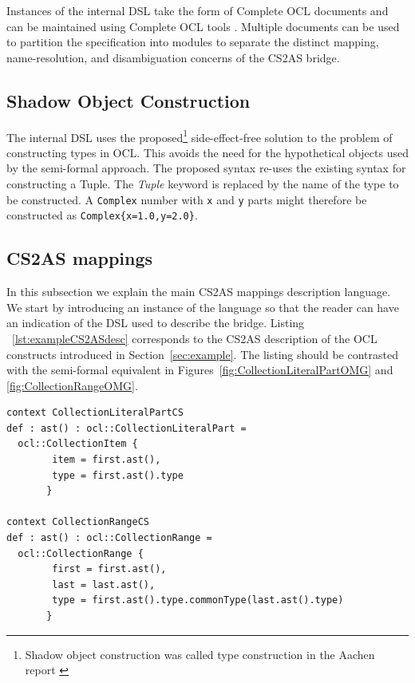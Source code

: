 \documentclass{llncs}
\begin{document}
Instances of the internal DSL take the form of Complete OCL documents and can be maintained using Complete OCL tools \cite{eclipseOclOnline}. Multiple documents can be used to partition the specification into modules %
to separate the distinct mapping, name-resolution, and disambiguation concerns of the CS2AS bridge.

\subsection{Shadow Object Construction}
\label{subsec:ShadowExp}

The internal DSL uses the proposed\footnote{Shadow object construction was called type construction in the Aachen report \cite{brucker2013aachenReport}} side-effect-free solution to the problem of constructing types in OCL. This avoids the need for the hypothetical objects used by the semi-formal approach. The proposed syntax re-uses the existing syntax for constructing a Tuple. The \emph{Tuple} keyword is replaced by the name of the type to be constructed. A \verb$Complex$ number with \verb$x$ and \verb$y$ parts might therefore be constructed as \verb$Complex{x=1.0,y=2.0}$. %

\subsection{CS2AS mappings}
\label{subsec:mappings}

In this subsection we explain the main CS2AS mappings description language. We start by introducing an instance of the language so that the reader can have an indication of the DSL used to describe the bridge. Listing ~\ref{lst:exampleCS2ASdesc} corresponds to the CS2AS description of the OCL constructs introduced in Section~\ref{sec:example}. The listing should be contrasted with the semi-formal equivalent in Figures~\ref{fig:CollectionLiteralPartOMG} and \ref{fig:CollectionRangeOMG}.

\begin{lstlisting}[caption=CS2AS bridge for CollectionLiteralPart and CollectionRange, label=lst:exampleCS2ASdesc, language=OCL]
context CollectionLiteralPartCS	
def : ast() : ocl::CollectionLiteralPart = 
  ocl::CollectionItem {
        item = first.ast(),	
        type = first.ast().type
       }
  
context CollectionRangeCS	
def : ast() : ocl::CollectionRange = 
  ocl::CollectionRange {
        first = first.ast(),
        last = last.ast(),
        type = first.ast().type.commonType(last.ast().type)
       }
\end{lstlisting}
\end{document}
